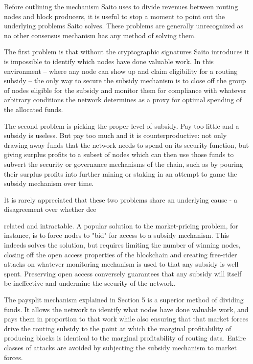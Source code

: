 \documentclass[11.5pt, oneside]{article}   	%
\begin{document}
\begin{multicols}{2}
Before outlining the  mechanism Saito uses to divide revenues between routing nodes and block producers, it is useful to stop a moment to point out the underlying problems Saito solves. These problems are generally unrecognized as no other consensus mechanism has any method of solving them.

The first problem is that without the cryptographic signatures Saito introduces it is impossible to identify which nodes have done valuable work. In this environment -- where any node can show up and claim eligibility for a routing subsidy -- the only way to secure the subsidy mechanism is to close off the group of nodes eligible for the subsidy and monitor them for compliance with whatever arbitrary conditions the network determines as a proxy for optimal spending of the allocated funds.

The second problem is picking the proper level of subsidy. Pay too little and a subsidy is useless. But pay too much and it is counterproductive: not only drawing away funds that the network needs to spend on its security function, but giving surplus profits to a subset of nodes which can then use those funds to subvert the security or governance mechanisms of the chain, such as by pouring their surplus profits into further mining or staking in an attempt to game the subsidy mechanism over time.

It is rarely appreciated that these two problems share an underlying cause - a disagreement over whether dee


 related and intractable. A popular solution to the market-pricing problem, for instance, is to force nodes to "bid" for access to a subsidy mechanism. This indeeds solves the solution, but requires limiting the number of winning nodes, closing off the open access properties of the blockchain and creating free-rider attacks on whatever monitoring mechanism is used to that any subsidy is well spent. Preserving open access conversely guarantees that any subsidy will itself be ineffective and undermine the security of the network.

The paysplit mechanism explained in Section 5 is a superior method of dividing funds. It allows the network to identify what nodes have done valuable work, and pays them in proportion to that work while also ensuring that that market forces drive the routing subsidy to the point at which the marginal profitability of producing blocks is identical to the marginal profitability of routing data. Entire classes of attacks are avoided by subjecting the subsidy mechanism to market forces.


\end{multicols}
\end{document}
